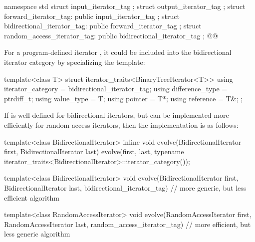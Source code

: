\begin{codeblock}
namespace std {
  struct input_iterator_tag { };
  struct output_iterator_tag { };
  struct forward_iterator_tag: public input_iterator_tag { };
  struct bidirectional_iterator_tag: public forward_iterator_tag { };
  struct random_access_iterator_tag: public bidirectional_iterator_tag { };
  @@
}
\end{codeblock}

\pnum
{}%
%
%
%
%
%
%
\begin{example}
For a program-defined iterator
,
it could be included
into the bidirectional iterator category by specializing the
template:

\begin{codeblock}
template<class T> struct iterator_traits<BinaryTreeIterator<T>> {
  using iterator_category = bidirectional_iterator_tag;
  using difference_type   = ptrdiff_t;
  using value_type        = T;
  using pointer           = T*;
  using reference         = T&;
};
\end{codeblock}
\end{example}

\pnum
\begin{example}
If
is well-defined for bidirectional iterators, but can be implemented more
efficiently for random access iterators, then the implementation is as follows:

\begin{codeblock}
template<class BidirectionalIterator>
inline void
evolve(BidirectionalIterator first, BidirectionalIterator last) {
  evolve(first, last,
    typename iterator_traits<BidirectionalIterator>::iterator_category());
}

template<class BidirectionalIterator>
void evolve(BidirectionalIterator first, BidirectionalIterator last,
  bidirectional_iterator_tag) {
  // more generic, but less efficient algorithm
}

template<class RandomAccessIterator>
void evolve(RandomAccessIterator first, RandomAccessIterator last,
  random_access_iterator_tag) {
  // more efficient, but less generic algorithm
}
\end{codeblock}
\end{example}


